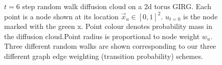 \begin{figure}
\begin{subfigure}{0.49\textwidth}
    \label{fig:diffmap_algo_comparisons_degscaled}
  \end{subfigure}
  \caption{$t=6$ step random walk diffusion cloud on a 2d torus GIRG. Each point is a node shown at its location $\vec{x}_u \in [0, 1]^2$. $u_{t=0}$ is the node marked with the green x. Point colour denotes probability mass in the diffusion cloud.Point radius is proportional to node weight $w_u$. Three different random walks are shown corresponding to our three different graph edge weighting (transition probability) schemes.}
  \label{fig:diffmap_algo_comparisons}
\end{figure}













